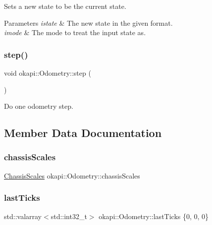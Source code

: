 Sets a new state to be the current state.


\begin{DoxyParams}{Parameters}
{\em istate} & The new state in the given format. \\
\hline
{\em imode} & The mode to treat the input state as. \\
\hline
\end{DoxyParams}
\mbox{\label{classokapi_1_1Odometry_a04586a88418c606f7bbd0ac3287c730d}} 
\subsubsection{\texorpdfstring{step()}{step()}}
{\footnotesize\ttfamily void okapi\+::\+Odometry\+::step (\begin{DoxyParamCaption}{ }\end{DoxyParamCaption})\hspace{0.3cm}{\ttfamily [virtual]}}

Do one odometry step. 

\subsection{Member Data Documentation}
\mbox{\label{classokapi_1_1Odometry_afb1605502a0164b1e946a15ae585ace0}} 
\subsubsection{\texorpdfstring{chassisScales}{chassisScales}}
{\footnotesize\ttfamily \mbox{\hyperlink{classokapi_1_1ChassisScales}{Chassis\+Scales}} okapi\+::\+Odometry\+::chassis\+Scales\hspace{0.3cm}{\ttfamily [protected]}}

\mbox{\label{classokapi_1_1Odometry_a7431f21a4bc30c9812f45e4f9d560cfa}} 
\subsubsection{\texorpdfstring{lastTicks}{lastTicks}}
{\footnotesize\ttfamily std\+::valarray$<$std\+::int32\+\_\+t$>$ okapi\+::\+Odometry\+::last\+Ticks \{0, 0, 0\}\hspace{0.3cm}{\ttfamily [protected]}}

